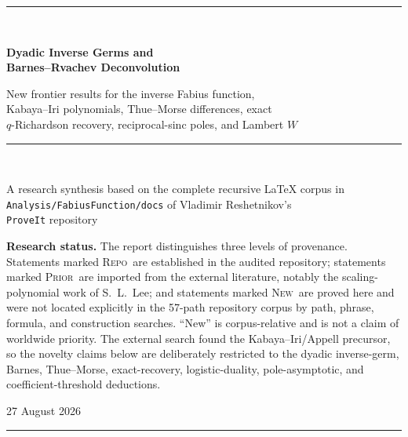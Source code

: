 \documentclass[11pt,oneside]{article}
\theoremstyle{frontier}
\theoremstyle{definition}
\theoremstyle{remark}
\newcommand{\statusrepo}{\textsc{Repo}}
\newcommand{\statuslit}{\textsc{Prior}}
\newcommand{\statusnew}{\textsc{New}}
\begin{document}
\hypersetup{pageanchor=false}
\begin{titlepage}
\centering
\vspace*{1.25cm}
{\color{DeepBlue}\rule{\textwidth}{1.2pt}}\\[1.15cm]
{\Huge\bfseries Dyadic Inverse Germs and\\[0.25em]
Barnes--Rvachev Deconvolution\par}
\vspace{0.65cm}
{\Large New frontier results for the inverse Fabius function,\\
Kabaya--Iri polynomials, Thue--Morse differences, exact\\
$q$-Richardson recovery, reciprocal-sinc poles, and Lambert $W$\par}
\vspace{1.05cm}
{\color{Teal}\rule{0.82\textwidth}{0.75pt}}\\[0.95cm]
{\large A research synthesis based on the complete recursive LaTeX corpus in\\
\texttt{Analysis/FabiusFunction/docs} of Vladimir Reshetnikov's\\
\texttt{ProveIt} repository\par}
\vfill
\begin{minipage}{0.88\textwidth}
\small
\textbf{Research status.} The report distinguishes three levels of provenance.  Statements marked
\statusrepo\ are established in the audited repository; statements marked \statuslit\ are imported
from the external literature, notably the scaling-polynomial work of S.~L.~Lee; and statements
marked \statusnew\ are proved here and were not located explicitly in the 57-path repository
corpus by path, phrase, formula, and construction searches.  ``New'' is corpus-relative and is not
a claim of worldwide priority.  The external search found the Kabaya--Iri/Appell precursor, so the
novelty claims below are deliberately restricted to the dyadic inverse-germ, Barnes, Thue--Morse,
exact-recovery, logistic-duality, pole-asymptotic, and coefficient-threshold deductions.
\end{minipage}
\vfill
{\large 27 August 2026\par}
\vspace{0.8cm}
{\color{DeepBlue}\rule{\textwidth}{1.2pt}}
\end{titlepage}
\hypersetup{pageanchor=true}
\end{document}
